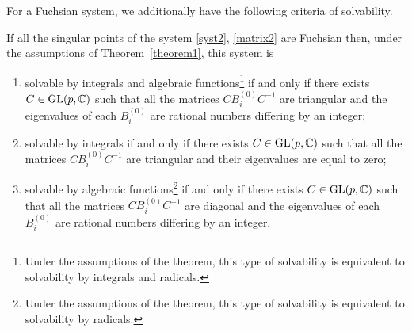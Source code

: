 For a Fuchsian system, we additionally have the following criteria of solvability.

\begin{Theorem}\label{theorem3}
If all the singular points of the system \eqref{syst2}, \eqref{matrix2} are Fuchsian then, under the assumptions of Theorem~{\rm \ref{theorem1}}, this system is
\begin{enumerate}\itemsep=0pt
	\item[$1)$] solvable by integrals and algebraic functions\footnote{Under the assumptions of the theorem, this type of solvability is equivalent to solvability by integrals and radicals.} if and only if there exists
	$C\in{\rm GL}(p,\mathbb C)$ such that all the matrices $CB^{(0)}_iC^{-1}$ are triangular and the eigenvalues of each $B^{(0)}_i$ are rational numbers differing by an integer;
	\item[$2)$] solvable by integrals if and only if there exists $C\in{\rm GL}(p,\mathbb C)$ such that all the matrices $CB^{(0)}_iC^{-1}$ are triangular and their eigenvalues are equal to zero;
	\item[$3)$] solvable by algebraic functions\footnote{Under the assumptions of the theorem, this type of solvability is equivalent to solvability by radicals.} if and only if there exists $C\in{\rm GL}(p,\mathbb C)$ such that all the matrices $CB^{(0)}_iC^{-1}$ are diagonal and the eigenvalues of each $B^{(0)}_i$ are rational numbers differing by an integer.
\end{enumerate}
\end{Theorem}

